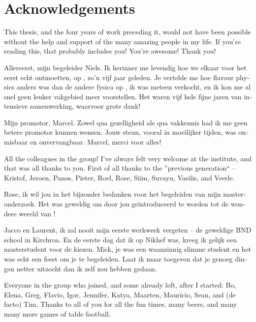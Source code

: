 \chapter*{Acknowledgements}

This thesis, and the four years of work preceding it, would not have been possible without the help and support of the many amazing people in my life.
If you're reading this, that probably includes you!
You're awesome!
Thank you!

\begin{otherlanguage}{dutch}
Allereerst, mijn begeleider Niels.
Ik herinner me levendig hoe we elkaar voor het eerst echt ontmoetten, op \cern, zo'n vijf jaar geleden.
Je vertelde me hoe flavour physics anders was dan de andere fysica op \cern, ik was meteen verkocht, en ik kon me al snel geen leuker vakgebied meer voorstellen.
Het waren vijf hele fijne jaren van intensieve samenwerking, waarvoor grote dank!

Mijn promotor, Marcel.
Zowel qua gezelligheid als qua vakkennis had ik me geen betere promotor kunnen wensen.
Jouw steun, vooral in moeilijker tijden, was onmisbaar en onvervangbaar.
Marcel, merci voor alles!
\end{otherlanguage}

All the colleagues in the group!
I've always felt very welcome at the institute, and that was all thanks to you.
First of all thanks to the ''previous generation`` -- Kristof, Jeroen, Panos, Pieter, Roel, Rose, Siim, Suvayu, Vasilis, and Veerle.
\begin{otherlanguage}{dutch}
Rose, ik wil jou in het bijzonder bedanken voor het begeleiden van mijn masteronderzoek.
Het was geweldig om door jou geïntroduceerd te worden tot de wondere wereld van \lhcb!

Jacco en Laurent, ik zal nooit mijn eerste werkweek vergeten -- de geweldige BND school in Kirchroa.
En de eerste dag dat ik op Nikhef was, kreeg ik gelijk een masterstudent voor de kiezen.
Mick, je was een waanzinnig slimme student en het was echt een feest om je te begeleiden.
Laat ik maar toegeven dat je genoeg dingen netter uitzocht dan ik zelf zou hebben gedaan.
\end{otherlanguage}

Everyone in the group who joined, and some already left, after I started: Bo, Elena, Greg, Flavio, Igor, Jennifer, Katya, Maarten, Maurício, Sean, and (de facto) Tim.
Thanks to all of you for all the fun times, many beers, and many many more games of table football.

